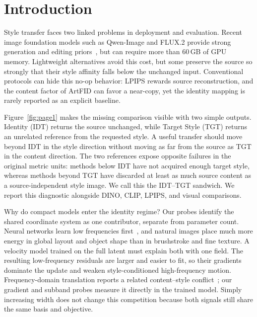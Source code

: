 \documentclass[letterpaper]{article}
\begin{document}
\section{Introduction}

Style transfer faces two linked problems in deployment and evaluation. Recent image
foundation models such as Qwen-Image and FLUX.2 provide strong generation and editing
priors~\cite{wu2025qwenimagetechnicalreport,blackforestlabs2025flux2}, but can require
more than 60\,GB of GPU memory. Lightweight alternatives
avoid this cost, but some preserve the source so strongly that their style affinity falls
below the unchanged input. Conventional protocols can hide this no-op behavior: LPIPS rewards
source reconstruction, and the content factor of ArtFID can favor a near-copy, yet the
identity mapping is rarely reported as an explicit baseline.

Figure~\ref{fig:page1} makes the missing comparison visible with two simple outputs.
Identity (IDT) returns the source unchanged, while Target Style (TGT) returns an unrelated
reference from the requested style. A useful transfer should move beyond IDT in the style
direction without moving as far from the source as TGT in the content direction. The two
references expose opposite failures in the original metric units: methods below IDT have
not acquired enough target style, whereas methods beyond TGT have discarded at least as
much source content as a source-independent style image. We call this the IDT--TGT sandwich.
We report this diagnostic alongside DINO, CLIP, LPIPS, and visual comparisons.

Why do compact models enter the identity regime? Our probes identify the shared coordinate
system as one contributor, separate from parameter count. Neural networks learn low
frequencies first~\cite{rahaman2019spectral,xu2022frequency}, and natural images place much
more energy in global layout and object shape than in brushstroke and fine texture. A
velocity model trained on the full latent must explain both with one field.
The resulting low-frequency residuals are larger and easier to fit, so their gradients
dominate the update and weaken style-conditioned high-frequency motion. Frequency-domain
translation reports a related content--style conflict~\cite{cai2021fdit}; our gradient and
subband probes measure it directly in the trained model. Simply increasing width does not
change this competition because both signals still share the same basis and objective.
\end{document}

